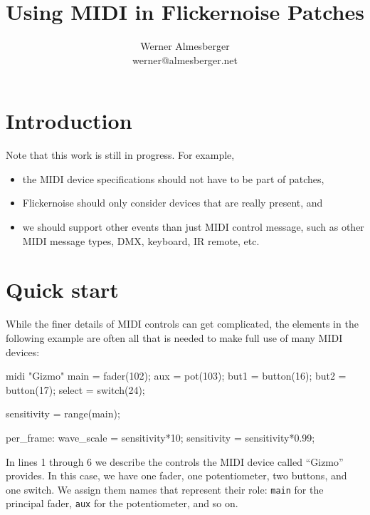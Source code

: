 \documentclass[11pt,a4paper]{article}
\begin{document}
\title{Using MIDI in Flickernoise Patches}
\author{Werner Almesberger \\
  {\normalsize werner@almesberger.net}}

\maketitle

\tableofcontents



\section{Introduction}

Note that this work is still in progress. For example,
\begin{itemize}
  \item the MIDI device specifications should not have to be part of
    patches,
  \item Flickernoise should only consider devices that are really present, and
  \item we should support other events than just MIDI control message,
    such as other MIDI message types, DMX, keyboard, IR remote, etc.
\end{itemize}




\section{Quick start}

While the finer details of MIDI controls can get complicated, the
elements in the following example are often all that is needed to
make full use of many MIDI devices:

\begin{listing}{1}
midi "Gizmo" {
	main = fader(102);
	aux = pot(103);
	but1 = button(16);
	but2 = button(17);
	select = switch(24);
}

sensitivity = range(main);

per_frame:
	wave_scale = sensitivity*10;
	sensitivity = sensitivity*0.99;
\end{listing}

In lines 1 through 6 we describe the controls the MIDI device called
``Gizmo'' provides. In this case, we have one fader, one potentiometer,
two buttons, and one switch. We assign them names that represent their
role: {\tt main}
for the principal fader, {\tt aux} for the potentiometer, and so on.
\end{document}
